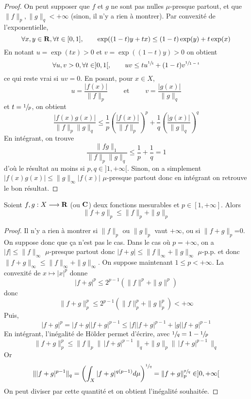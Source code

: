 \begin{proof}
    On peut supposer que $f $ et  $g$ ne sont pas nulles  $\mu$-presque partout, et que  $\|f\|_p, \|g\|_q<+\infty$ (sinon, il n'y a rien à montrer). Par convexité de l'exponentielle, \[
        \forall  x , y \in  \mathbf R, \forall  t \in  [0, 1], \qquad  \exp((1-t)y+tx)\leq (1-t)\exp(y)+t\exp(x)
    \] 
    En notant $u=\exp(tx)>0$ et $v=\exp((1-t)y)>0$ on obtient \[
        \forall  u, v>0, \forall  t \in  ]0, 1[, \qquad  uv\leq tu^{\sfrac1t}+(1-t)v^{\sfrac1{1-t}}
    \] 
    ce qui reste vrai si $uv=0$. En posant, pour  $x \in X$, \[
        u=\frac{|f(x)|}{\|f\|_p} \qquad  \text{ et  }\qquad  v= \frac{|g(x)|}{\|g\|_q}
    \]
    et $t=\sfrac1p$, on obtient  \[
        \frac{|f(x)g(x)|}{\|f\|_p \|g\|_q}\leq \frac{1}{p}\left(\frac{|f(x)|}{\|f\|_{p}}\right)^{p}+\frac{1}{q}\left(\frac{|g(x)|}{\|g\|_{q}}\right)^q
    \] 
    En intégrant, on trouve \[
    \frac{\|fg\|_1}{\|f\|_p \|g\|_q} \leq \frac1p+\frac1q=1
    \]
    d'où le résultat au moins si $p,q \in  ]1, +\infty[$. Sinon, on a simplement $|f(x)g(x)|\leq \|g\|_\infty |f(x)|$ $\mu$-presque partout donc en intégrant on retrouve le bon résultat.
\end{proof}

\begin{thm}
    Soient $f, g:X \longrightarrow \mathbf R$ (ou $\mathbf C$) deux fonctions mesurables et $p \in  [1, +\infty]$. Alors \[
    \|f+g\|_p\leq \|f\|_p+\|g\|_p
    \] 
\end{thm}

\begin{proof}
    Il n'y a rien à montrer si $\|f\|_p$ ou $\|g\|_p$ vaut $+\infty$, ou si  $\|f+g\|_p$=0. On suppose donc que ça n'est pas le cas. Dans le cas où $p=+\infty$, on a  $|f|\leq \|f\|_{\infty}$ $\mu$-presque partout donc  $|f+g|\leq \|f\|_\infty+\|g\|_{\infty}$ $\mu$-p.p. et donc  $\|f+g\|_\infty\leq \|f\|_\infty+\|g\|_\infty$. On suppose maintenant $1\leq p<+\infty$.  La convexité de $x \longmapsto |x|^p$ donne \[
        |f+g|^p\leq 2^{p-1}(\|f\|^p+ \|g\|^p)
    \] 
    donc \[
        \|f+g\|_p^p\leq 2^{p-1}(\|f\|_p^p+\|g\|_p^p)<+\infty
    \] 
    Puis, \[
    |f+g|^p=|f+g||f+g|^{p-1} \leq |f||f+g|^{p-1}+|g||f+g|^{p-1}
    \]
    En intégrant, l'inégalité de Hölder permet d'écrire, avec $\sfrac1q=1-\sfrac1p$\[
    \|f+g\|_p^p \leq \|f\|_p\|\,|f+g|^{p-1}\,\|_q + \|g\|_p\| \,|f+g|^{p-1}\,\|_q
    \]
    Or \[
    \| |f+g|^{p-1}\|_q = \left( \int_X |f+g|^{q(p-1)} d\mu\right)^{\sfrac1q} =  \|f+g\|_p^{\sfrac{p}{q}} \in ]0,+\infty[
    \] 
    On peut diviser par cette quantité et on obtient l'inégalité souhaitée.
\end{proof}

